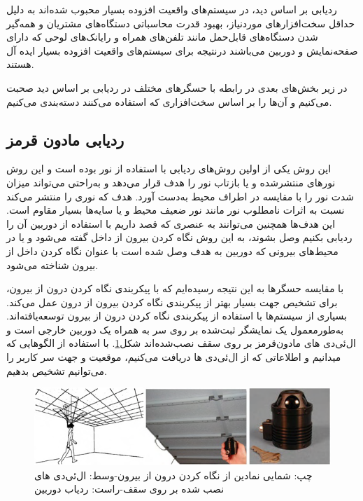 ردیابی بر اساس دید، در سیستم‌های واقعیت افزوده بسیار محبوب شده‌اند به دلیل حداقل سخت‌افزارهای موردنیاز، بهبود قدرت محاسباتی دستگاه‌های مشتریان  و همه‌گیر شدن دستگاه‌های قابل‌حمل مانند تلفن‌های همراه و رایانک‌های لوحی که دارای صفحه‌نمایش و دوربین می‌باشند درنتیجه برای سیستم‌های واقعیت افزوده بسیار ایده آل هستند.

در زیر بخش‌های بعدی در رابطه با حسگرهای مختلف در ردیابی بر اساس دید صحبت می‌کنیم و آن‌ها را بر اساس سخت‌افزاری که استفاده می‌کنند دسته‌بندی می‌کنیم.


\subsection{ردیابی مادون قرمز\protect{}}
این روش یکی از اولین روش‌های ردیابی با استفاده از نور بوده است و این روش نورهای منتشرشده و یا بازتاب نور را هدف قرار می‌دهد و به‌راحتی می‌تواند میزان شدت نور را با مقایسه در اطراف محیط به‌دست آورد\cite{bajura1995dynamic}. هدف که نوری را منتشر می‌کند نسبت به اثرات نامطلوب نور مانند نور ضعیف محیط و یا سایه‌ها بسیار مقاوم است. این هدف‌ها همچنین می‌توانند به عنصری که قصد داریم با استفاده از دوربین آن را ردیابی بکنیم وصل بشوند، به این روش نگاه کردن بیرون از داخل \cite{ribo2001new}گفته می‌شود و یا در محیط‌های بیرونی که دوربین به هدف وصل شده است با عنوان نگاه کردن داخل از بیرون شناخته می‌شود\cite{gottschalk1993autocalibration}. 

با مقایسه حسگرها به این نتیجه رسیده‌ایم که با پیکربندی نگاه کردن درون از بیرون، برای تشخیص جهت بسیار بهتر از پیکربندی نگاه کردن بیرون از درون عمل می‌کند. بسیاری از سیستم‌ها با استفاده از پیکربندی نگاه کردن درون از بیرون  توسعه‌یافته‌اند. به‌طورمعمول یک نمایشگر ثبت‌شده بر روی سر  به همراه یک دوربین  خارجی است و ال‌ئی‌دی های مادون‌قرمز بر روی سقف نصب‌شده‌اند شکل\ref{fig:infrared}. با استفاده از الگوهایی که میدانیم و اطلاعاتی که از ال‌ئی‌دی ها دریافت می‌کنیم، موقعیت و جهت سر کاربر را می‌توانیم تشخیص بدهیم\cite{welch1999hiball}.
\begin{figure}
	\centering
	\includegraphics[width=1\linewidth]{image/infrared}
	\caption {چپ: شمایی نمادین از نگاه کردن درون از بیرون-وسط: ال‌ئی‌دی های نصب شده بر روی سقف-راست: ردیاب دوربین\cite{welch1999hiball}}
	\label{fig:infrared}
\end{figure}

